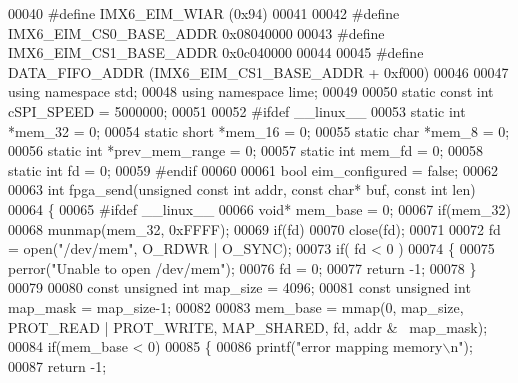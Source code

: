 \begin{DoxyCode}
00040 \textcolor{preprocessor}{#define IMX6\_EIM\_WIAR (0x94)}
00041 
00042 \textcolor{preprocessor}{#define IMX6\_EIM\_CS0\_BASE\_ADDR 0x08040000}
00043 \textcolor{preprocessor}{#define IMX6\_EIM\_CS1\_BASE\_ADDR 0x0c040000}
00044 
00045 \textcolor{preprocessor}{#define DATA\_FIFO\_ADDR (IMX6\_EIM\_CS1\_BASE\_ADDR + 0xf000)}
00046 
00047 \textcolor{keyword}{using namespace }std;
00048 \textcolor{keyword}{using namespace }lime;
00049 
00050 \textcolor{keyword}{static} \textcolor{keyword}{const} \textcolor{keywordtype}{int} cSPI_SPEED = 5000000;
00051 
00052 \textcolor{preprocessor}{#ifdef \_\_linux\_\_}
00053 \textcolor{keyword}{static} \textcolor{keywordtype}{int}   *mem\_32 = 0;
00054 \textcolor{keyword}{static} \textcolor{keywordtype}{short} *mem\_16 = 0;
00055 \textcolor{keyword}{static} \textcolor{keywordtype}{char}  *mem\_8 = 0;
00056 \textcolor{keyword}{static} \textcolor{keywordtype}{int}   *prev\_mem\_range = 0;
00057 \textcolor{keyword}{static} \textcolor{keywordtype}{int} mem\_fd = 0;
00058 \textcolor{keyword}{static} \textcolor{keywordtype}{int} fd = 0;
00059 \textcolor{preprocessor}{#endif}
00060 
00061 \textcolor{keywordtype}{bool} eim_configured = \textcolor{keyword}{false};
00062 
00063 \textcolor{keywordtype}{int} fpga_send(\textcolor{keywordtype}{unsigned} \textcolor{keyword}{const} \textcolor{keywordtype}{int} addr, \textcolor{keyword}{const} \textcolor{keywordtype}{char}* buf, \textcolor{keyword}{const} \textcolor{keywordtype}{int} len)
00064 \{
00065 \textcolor{preprocessor}{#ifdef \_\_linux\_\_}
00066     \textcolor{keywordtype}{void}* mem\_base = 0;
00067     \textcolor{keywordflow}{if}(mem\_32)
00068         munmap(mem\_32, 0xFFFF);
00069     \textcolor{keywordflow}{if}(fd)
00070         close(fd);
00071 
00072     fd = open(\textcolor{stringliteral}{"/dev/mem"}, O\_RDWR | O\_SYNC);
00073     \textcolor{keywordflow}{if}( fd < 0 )
00074     \{
00075         perror(\textcolor{stringliteral}{"Unable to open /dev/mem"});
00076         fd = 0;
00077         \textcolor{keywordflow}{return} -1;
00078     \}
00079 
00080     \textcolor{keyword}{const} \textcolor{keywordtype}{unsigned} \textcolor{keywordtype}{int} map\_size = 4096;
00081     \textcolor{keyword}{const} \textcolor{keywordtype}{unsigned} \textcolor{keywordtype}{int} map\_mask = map\_size-1;
00082 
00083     mem\_base = mmap(0, map\_size, PROT\_READ | PROT\_WRITE, MAP\_SHARED, fd, addr & ~map\_mask);
00084     \textcolor{keywordflow}{if}(mem\_base < 0)
00085     \{
00086         printf(\textcolor{stringliteral}{"error mapping memory\(\backslash\)n"});
00087         \textcolor{keywordflow}{return} -1;

\end{DoxyCode}
